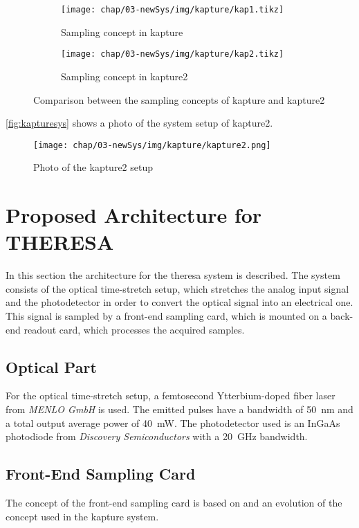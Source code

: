 \begin{figure}[H]
	\centering
	\begin{subfigure}{0.48\textwidth}
		\centering
		\texttt{[image: chap/03-newSys/img/kapture/kap1.tikz]}  
		\caption{Sampling concept in \gls{kapture}}
		\label{fig:kap1}
	\end{subfigure}
	\hfill
	\begin{subfigure}{0.48\textwidth}
		\centering
		\texttt{[image: chap/03-newSys/img/kapture/kap2.tikz]}  
		\caption{Sampling concept in \gls{kapture2}}
		\label{fig:kap2}
	\end{subfigure}
	\caption[Comparison between KAPTURE and KAPTURE-2]{Comparison between the sampling concepts of \gls{kapture} and \gls{kapture2}}
	\label{fig:kap1_vs_kap2}
\end{figure}
\autoref{fig:kapturesys} shows a photo of the system setup of \gls{kapture2}.
\begin{figure}[H]
	\centering
	\texttt{[image: chap/03-newSys/img/kapture/kapture2.png]}
	\caption[Photo of KAPTURE v2 system]{Photo of the \gls{kapture2} setup}
	\label{fig:kapturesys}
\end{figure}


\newpage
\section{Proposed Architecture for THERESA}
In this section the architecture for the \gls{theresa} system is described.
The system consists of the optical time-stretch setup, which stretches the analog input signal and the photodetector in order to convert the optical signal into an electrical one.
This signal is sampled by a front-end sampling card, which is mounted on a back-end readout card, which processes the acquired samples.

\subsection*{Optical Part}
For the optical time-stretch setup, a femtosecond Ytterbium-doped fiber laser from \textit{MENLO GmbH} is used. The emitted pulses have a bandwidth of \SI{50}{\nano \meter} and a total output average power of \SI{40}{\milli \watt}.
The photodetector used is an InGaAs photodiode from \textit{Discovery Semiconductors} with a \SI{20}{\GHz} bandwidth.

\subsection{Front-End Sampling Card}
The concept of the front-end sampling card is based on and an evolution of the concept used in the \gls{kapture} system. 

